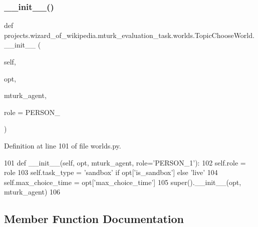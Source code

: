 \subsubsection{\texorpdfstring{\+\_\+\+\_\+init\+\_\+\+\_\+()}{\_\_init\_\_()}}
{\footnotesize\ttfamily def projects.\+wizard\+\_\+of\+\_\+wikipedia.\+mturk\+\_\+evaluation\+\_\+task.\+worlds.\+Topic\+Choose\+World.\+\_\+\+\_\+init\+\_\+\+\_\+ (\begin{DoxyParamCaption}\item[{}]{self,  }\item[{}]{opt,  }\item[{}]{mturk\+\_\+agent,  }\item[{}]{role = {\ttfamily \textquotesingle{}PERSON\+\_\textquotesingle{}} }\end{DoxyParamCaption})}



Definition at line 101 of file worlds.\+py.


\begin{DoxyCode}
101     \textcolor{keyword}{def }\_\_init\_\_(self, opt, mturk\_agent, role='PERSON\_1'):
102         self.role = role
103         self.task\_type = \textcolor{stringliteral}{'sandbox'} \textcolor{keywordflow}{if} opt[\textcolor{stringliteral}{'is\_sandbox'}] \textcolor{keywordflow}{else} \textcolor{stringliteral}{'live'}
104         self.max\_choice\_time = opt[\textcolor{stringliteral}{'max\_choice\_time'}]
105         super().\_\_init\_\_(opt, mturk\_agent)
106 
\end{DoxyCode}


\subsection{Member Function Documentation}
\mbox{\label{classprojects_1_1wizard__of__wikipedia_1_1mturk__evaluation__task_1_1worlds_1_1TopicChooseWorld_a09c14d33c1bc510ad995270b98976123}} 
